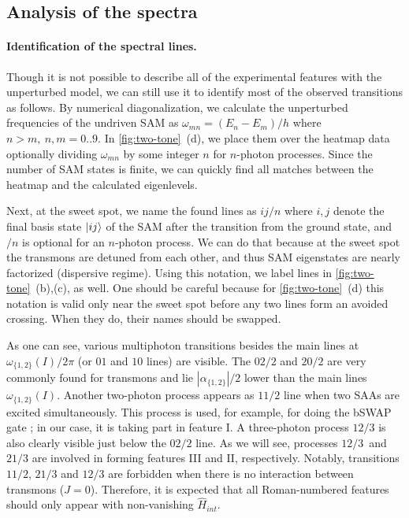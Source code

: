 \documentclass[%
 aps, prx,
 amsmath,amssymb,
 reprint,%
superscriptaddress
]{revtex4-2}
\begin{document}
\subsection{Analysis of the spectra} 
\label{sec:analysis}

\paragraph{Identification of the spectral lines.} 
Though it is not possible to describe all of the 
experimental features with the unperturbed model, 
we can still use it to identify most of the 
observed transitions as follows. By numerical diagonalization, we calculate the 
unperturbed frequencies of the undriven SAM as 
$\omega_{mn} = (E_n - E_m)/h$ where $n>m,\  
n,m=0..9$. In \autoref{fig:two-tone}~(d), we 
place them over the heatmap data optionally dividing 
$\omega_{mn}$ by some integer $n$ for $n$-photon processes. 
Since the number of SAM states is finite, we can 
quickly find all matches between the heatmap and the calculated eigenlevels. 

Next, at the sweet spot, we name the found lines 
as $ij/n$ where $i,j$ denote the final basis 
state $\ket{ij}$ of the SAM after the transition 
from the ground state, and $/n$ is optional for 
an $n$-photon process. We can do that because at 
the sweet spot the transmons are detuned from 
each other, and thus SAM eigenstates are nearly 
factorized (dispersive regime). Using this 
notation, we label lines in 
\autoref{fig:two-tone}~(b),(c), as well. One 
should be careful because for 
\autoref{fig:two-tone}~(d) this notation is valid 
only near the sweet spot before any two lines 
form an avoided crossing. When they do, their 
names should be swapped.
 
As one can see, various multiphoton transitions besides 
the main lines at $\omega_{\{1,2\}}(I)/2\pi$ (or 
$01$ and $10$ lines) are visible. The ${02/2}$ and ${20/2}$ 
are very commonly found for transmons and lie 
$|\alpha_{\{1,2\}}|/2$ lower than the main lines 
$\omega_{\{1,2\}}(I)$. Another two-photon process 
appears as $11/2$ line when two SAAs are excited 
simultaneously. This process is used, for 
example, for doing the bSWAP 
gate \cite{poletto2012entanglement}; in our case, 
it is taking part in feature I. A 
three-photon process $12/3$ is also clearly 
visible just below the $02/2$ line. As we will 
see, processes $12/3$~and~$21/3$ are involved in forming features III and II, respectively. Notably, transitions $11/2$, ${21/3}$ and 
${12/3}$ are forbidden when there is no 
interaction between transmons ($J=0$). Therefore, 
it is expected that all Roman-numbered features 
should only appear with non-vanishing $\hat 
H_{int}$.
\end{document}
